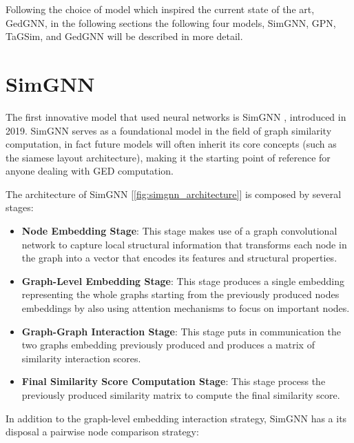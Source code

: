 \documentclass[../Thesis.tex]{subfiles}
\begin{document}
Following the choice of model which inspired the current state of the art, GedGNN\cite{computing_graph_edit_distance_via_neural_graph_matching}, in the following sections the following four models, SimGNN\cite{simgnn__a_neural_network_approach_to_fast_graph_similarity_computation}, GPN\cite{noah__neural_optimized_a*_search_algorithm_for_graph_edit_distance_computation}, TaGSim\cite{TaGSim_type_aware_graph_similarity_learning_and_computation}, and GedGNN\cite{computing_graph_edit_distance_via_neural_graph_matching} will be described in more detail.
	
	\section{SimGNN}
	\label{sec:simgnn}
	
	The first innovative model that used neural networks is SimGNN \cite{simgnn__a_neural_network_approach_to_fast_graph_similarity_computation}, introduced in 2019. SimGNN serves as a foundational model in the field of graph similarity computation, in fact future models will often inherit its core concepts (such as the siamese layout architecture), making it the starting point of reference for anyone dealing with GED computation. 
	
	The architecture of SimGNN [\autoref{fig:simgnn_architecture}] is composed by several stages:
	
	\begin{itemize}
		\item \textbf{Node Embedding Stage}: This stage makes use of a graph convolutional network to capture local structural information that transforms each node in the graph into a vector that encodes its features and structural properties.
		\item \textbf{Graph-Level Embedding Stage}: This stage produces a single embedding representing the whole graphs starting from the previously produced nodes embeddings by also using attention mechanisms to focus on important nodes.
		\item \textbf{Graph-Graph Interaction Stage}: This stage puts in communication the two graphs embedding previously produced and produces a matrix of similarity interaction scores.
		\item \textbf{Final Similarity Score Computation Stage}: This stage process the previously produced similarity matrix to compute the final similarity score.
	\end{itemize}
	
	In addition to the graph-level embedding interaction strategy, SimGNN has a its disposal a pairwise node comparison strategy:
	
\end{document}
